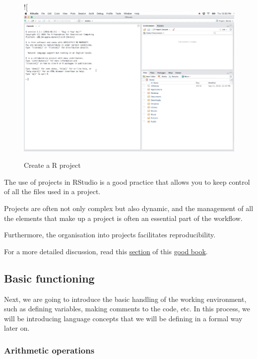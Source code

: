 \documentclass[
  letterpaper,
  DIV=11,
  numbers=noendperiod]{scrartcl}
\begin{document}
\begin{figure}

{\centering 

!{[}\includegraphics{images/create RProject.gif}

}

\caption{\label{fig-project}Create a R project}

\end{figure}

The use of projects in RStudio is a good practice that allows you to
keep control of all the files used in a project.

Projects are often not only complex but also dynamic, and the management
of all the elements that make up a project is often an essential part of
the workflow.

Furthermore, the organisation into projects facilitates reproducibility.

For a more detailed discussion, read this
\href{https://r4ds.hadley.nz/workflow-scripts.html\#projects}{section}
of this \href{https://r4ds.hadley.nz/}{good book}.

\hypertarget{basic-functioning}{%
\subsection{Basic functioning}\label{basic-functioning}}

Next, we are going to introduce the basic handling of the working
environment, such as defining variables, making comments to the code,
etc. In this process, we will be introducing language concepts that we
will be defining in a formal way later on.

\hypertarget{arithmetic-operations}{%
\subsubsection{Arithmetic operations}\label{arithmetic-operations}}
\end{document}
